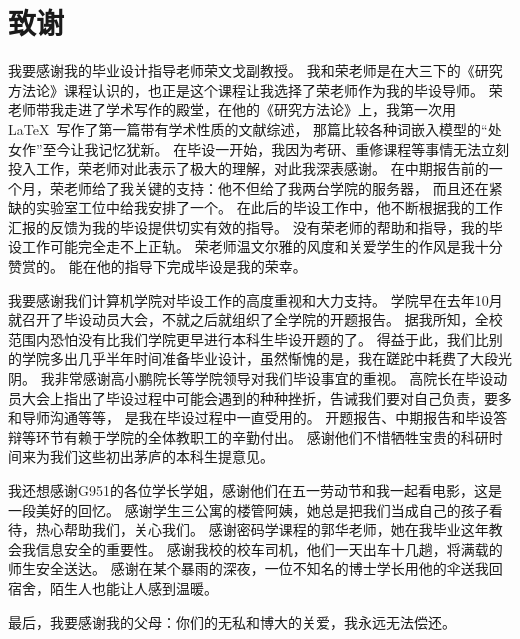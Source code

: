 \chapter*{致谢}
我要感谢我的毕业设计指导老师荣文戈副教授。
我和荣老师是在大三下的《研究方法论》课程认识的，也正是这个课程让我选择了荣老师作为我的毕设导师。
荣老师带我走进了学术写作的殿堂，在他的《研究方法论》上，我第一次用\LaTeX\ 写作了第一篇带有学术性质的文献综述，
那篇比较各种词嵌入模型的“处女作”至今让我记忆犹新。
在毕设一开始，我因为考研、重修课程等事情无法立刻投入工作，荣老师对此表示了极大的理解，对此我深表感谢。
在中期报告前的一个月，荣老师给了我关键的支持：他不但给了我两台学院的服务器，
而且还在紧缺的实验室工位中给我安排了一个。
在此后的毕设工作中，他不断根据我的工作汇报的反馈为我的毕设提供切实有效的指导。
没有荣老师的帮助和指导，我的毕设工作可能完全走不上正轨。
荣老师温文尔雅的风度和关爱学生的作风是我十分赞赏的。
能在他的指导下完成毕设是我的荣幸。

我要感谢我们计算机学院对毕设工作的高度重视和大力支持。
学院早在去年10月就召开了毕设动员大会，不就之后就组织了全学院的开题报告。
据我所知，全校范围内恐怕没有比我们学院更早进行本科生毕设开题的了。
得益于此，我们比别的学院多出几乎半年时间准备毕业设计，虽然惭愧的是，我在蹉跎中耗费了大段光阴。
我非常感谢高小鹏院长等学院领导对我们毕设事宜的重视。
高院长在毕设动员大会上指出了毕设过程中可能会遇到的种种挫折，告诫我们要对自己负责，要多和导师沟通等等，
是我在毕设过程中一直受用的。
开题报告、中期报告和毕设答辩等环节有赖于学院的全体教职工的辛勤付出。
感谢他们不惜牺牲宝贵的科研时间来为我们这些初出茅庐的本科生提意见。

我还想感谢G951的各位学长学姐，感谢他们在五一劳动节和我一起看电影，这是一段美好的回忆。
感谢学生三公寓的楼管阿姨，她总是把我们当成自己的孩子看待，热心帮助我们，关心我们。
感谢密码学课程的郭华老师，她在我毕业这年教会我信息安全的重要性。
感谢我校的校车司机，他们一天出车十几趟，将满载的师生安全送达。
感谢在某个暴雨的深夜，一位不知名的博士学长用他的伞送我回宿舍，陌生人也能让人感到温暖。

最后，我要感谢我的父母：你们的无私和博大的关爱，我永远无法偿还。
\cleardoublepage
